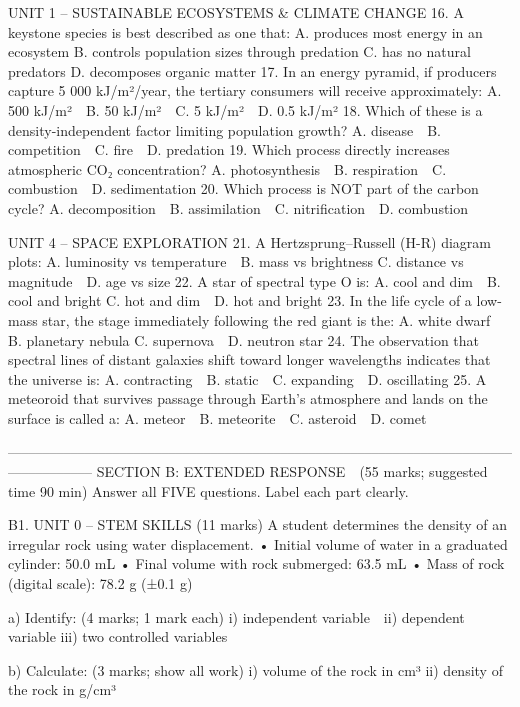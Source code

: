 UNIT 1 – SUSTAINABLE ECOSYSTEMS & CLIMATE CHANGE    
16. A keystone species is best described as one that:    
   A. produces most energy in an ecosystem    
   B. controls population sizes through predation    
   C. has no natural predators    
   D. decomposes organic matter    
17. In an energy pyramid, if producers capture 5 000 kJ/m²/year, the tertiary consumers will receive approximately:    
   A. 500 kJ/m² B. 50 kJ/m² C. 5 kJ/m² D. 0.5 kJ/m²    
18. Which of these is a density-independent factor limiting population growth?    
   A. disease B. competition C. fire D. predation    
19. Which process directly increases atmospheric CO₂ concentration?    
   A. photosynthesis B. respiration C. combustion D. sedimentation    
20. Which process is NOT part of the carbon cycle?    
   A. decomposition B. assimilation C. nitrification D. combustion    
  
UNIT 4 – SPACE EXPLORATION    
21. A Hertzsprung–Russell (H-R) diagram plots:    
   A. luminosity vs temperature B. mass vs brightness    
   C. distance vs magnitude D. age vs size    
22. A star of spectral type O is:    
   A. cool and dim B. cool and bright    
   C. hot and dim D. hot and bright    
23. In the life cycle of a low-mass star, the stage immediately following the red giant is the:    
   A. white dwarf B. planetary nebula    
   C. supernova D. neutron star    
24. The observation that spectral lines of distant galaxies shift toward longer wavelengths indicates that the universe is:    
   A. contracting B. static C. expanding D. oscillating    
25. A meteoroid that survives passage through Earth’s atmosphere and lands on the surface is called a:    
   A. meteor B. meteorite C. asteroid D. comet    
  
––––––––––––––––––––––––––––––––––––––––––––––––––––––––––––––––––––––––––––––––––––    
SECTION B: EXTENDED RESPONSE (55 marks; suggested time 90 min)    
Answer all FIVE questions. Label each part clearly.    
  
B1. UNIT 0 – STEM SKILLS (11 marks)    
A student determines the density of an irregular rock using water displacement.    
• Initial volume of water in a graduated cylinder: 50.0 mL    
• Final volume with rock submerged: 63.5 mL    
• Mass of rock (digital scale): 78.2 g (±0.1 g)    
  
a) Identify: (4 marks; 1 mark each)    
   i) independent variable ii) dependent variable    
   iii) two controlled variables    
  
b) Calculate: (3 marks; show all work)    
   i) volume of the rock in cm³    
   ii) density of the rock in g/cm³    
  
